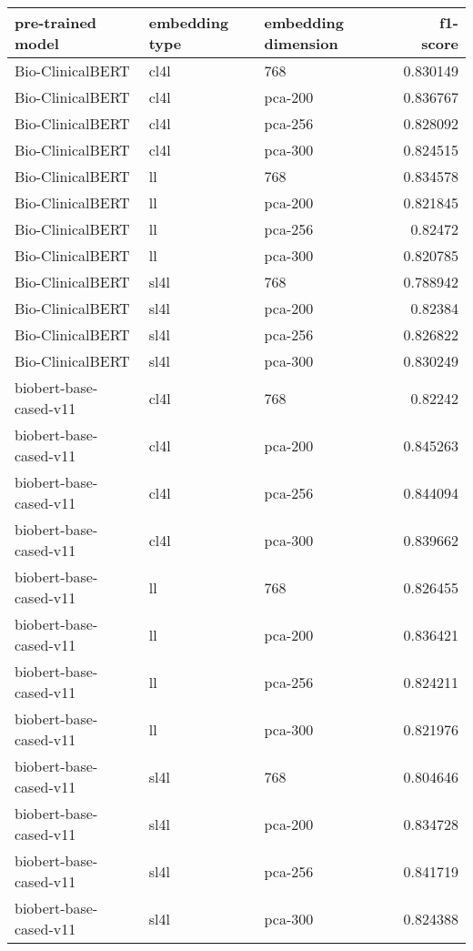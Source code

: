 \begin{tabular}{lllr}
\hline
 pre-trained model      & embedding type   & embedding dimension   &   f1-score \\
\hline
 Bio-ClinicalBERT       & cl4l             & 768                   &   0.830149 \\
 Bio-ClinicalBERT       & cl4l             & pca-200               &   0.836767 \\
 Bio-ClinicalBERT       & cl4l             & pca-256               &   0.828092 \\
 Bio-ClinicalBERT       & cl4l             & pca-300               &   0.824515 \\
 Bio-ClinicalBERT       & ll               & 768                   &   0.834578 \\
 Bio-ClinicalBERT       & ll               & pca-200               &   0.821845 \\
 Bio-ClinicalBERT       & ll               & pca-256               &   0.82472  \\
 Bio-ClinicalBERT       & ll               & pca-300               &   0.820785 \\
 Bio-ClinicalBERT       & sl4l             & 768                   &   0.788942 \\
 Bio-ClinicalBERT       & sl4l             & pca-200               &   0.82384  \\
 Bio-ClinicalBERT       & sl4l             & pca-256               &   0.826822 \\
 Bio-ClinicalBERT       & sl4l             & pca-300               &   0.830249 \\
 biobert-base-cased-v11 & cl4l             & 768                   &   0.82242  \\
 biobert-base-cased-v11 & cl4l             & pca-200               &   0.845263 \\
 biobert-base-cased-v11 & cl4l             & pca-256               &   0.844094 \\
 biobert-base-cased-v11 & cl4l             & pca-300               &   0.839662 \\
 biobert-base-cased-v11 & ll               & 768                   &   0.826455 \\
 biobert-base-cased-v11 & ll               & pca-200               &   0.836421 \\
 biobert-base-cased-v11 & ll               & pca-256               &   0.824211 \\
 biobert-base-cased-v11 & ll               & pca-300               &   0.821976 \\
 biobert-base-cased-v11 & sl4l             & 768                   &   0.804646 \\
 biobert-base-cased-v11 & sl4l             & pca-200               &   0.834728 \\
 biobert-base-cased-v11 & sl4l             & pca-256               &   0.841719 \\
 biobert-base-cased-v11 & sl4l             & pca-300               &   0.824388 \\
\hline
\end{tabular}